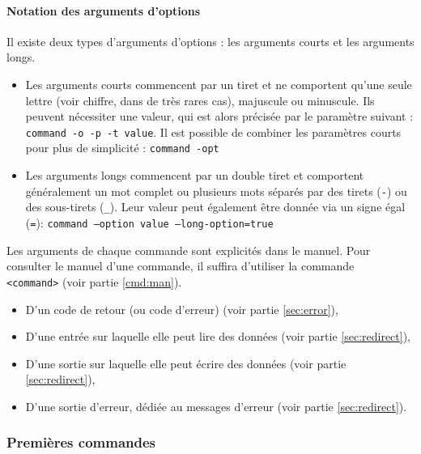 \paragraph{Notation des arguments d'options}

Il existe deux types d'arguments d'options : les arguments courts et les arguments longs.
\begin{itemize}
    \item Les arguments courts commencent par un tiret et ne comportent qu'une seule lettre (voir chiffre, dans de très rares cas), majuscule ou minuscule.  Ils peuvent nécessiter une valeur, qui est alors précisée par le paramètre suivant : \texttt{command -o -p -t value}.\newline
    Il est possible de combiner les paramètres courts pour plus de simplicité : \texttt{command -opt}\vspace{\baselineskip}
    
    \item Les arguments longs commencent par un double tiret et comportent généralement un mot complet ou plusieurs mots séparés par des tirets (\texttt{-}) ou des sous-tirets (\texttt{\_}). Leur valeur peut également être donnée via un signe égal (\texttt{=}): \texttt{command --option value --long-option=true}
\end{itemize}
\newpage

Les arguments de chaque commande sont explicités dans le manuel. Pour consulter le manuel d'une commande, il suffira d'utiliser la commande \texttt{ <command>} (voir partie \ref{cmd:man}).

\begin{itemize}
    \item D'un code de retour (ou code d'erreur) (voir partie \ref{sec:error}),
    \item D'une entrée sur laquelle elle peut lire des données (voir partie \ref{sec:redirect}),
    \item D'une sortie sur laquelle elle peut écrire des données (voir partie \ref{sec:redirect}),
    \item D'une sortie d'erreur, dédiée au messages d'erreur (voir partie \ref{sec:redirect}).
\end{itemize}

\subsubsection{Premières commandes}

